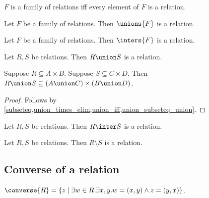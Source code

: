 \begin{abbreviation}\label{family_of_relations}
    $F$ is a family of relations iff
    every element of $F$ is a relation.
\end{abbreviation}

\begin{proposition}\label{unions_of_family_of_relations_is_relation}
    Let $F$ be a family of relations.
    Then $\unions{F}$ is a relation.
\end{proposition}

\begin{proposition}\label{inters_of_family_of_relations_is_relation}
    Let $F$ be a family of relations.
    Then $\inters{F}$ is a relation.
\end{proposition}

\begin{proposition}\label{union_relations_is_relation}
    Let $R, S$ be relations.
    Then $R\union S$ is a relation.
\end{proposition}

\begin{proposition}\label{union_relations_is_relation_type}
    Suppose $R\subseteq A\times B$.
    Suppose $S\subseteq C\times D$.
    Then $R\union S\subseteq (A\union C)\times (B\union D)$.
\end{proposition}
\begin{proof}
    Follows by \cref{subseteq,union_times_elim,union_iff,union_subseteq_union}.
\end{proof}

\begin{proposition}\label{inter_relations_is_relation}
    Let $R, S$ be relations.
    Then $R\inter S$ is a relation.
\end{proposition}

\begin{proposition}\label{setminus_relations_is_relation}
    Let $R, S$ be relations.
    Then $R\setminus S$ is a relation.
\end{proposition}



\subsection{Converse of a relation}

\begin{definition}\label{converse_relation}
    $\converse{R} = \{ z\mid \exists w\in R. \exists x, y. w = (x, y)\land z = (y, x)\}$.
\end{definition}

